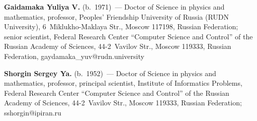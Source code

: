 \vspace*{1pt}

\noindent
\textbf{Gaidamaka Yuliya V.} (b.\ 1971)~--- Doctor of Science in physics and 
mathematics, professor, Peoples' Friendship University of Russia (RUDN 
University), 6~Miklukho-Maklaya Str., Moscow 117198, Russian Federation; 
senior scientist, Federal Research Center ``Computer Science and Control'' of the 
Russian Academy of Sciences, 44-2~Vavilov Str., Moscow 119333, Russian 
Federation, \mbox{gaydamaka\_yuv@rudn.university}

\vspace*{1pt}

\noindent
\textbf{Shorgin Sergey Ya.} (b.\ 1952)~--- Doctor of Science in physics and 
mathematics, professor, principal scientist, Institute of Informatics Problems, 
Federal Research Center ``Computer Science and Control'' of the Russian 
Academy of Sciences, 44-2~Vavilov Str., Moscow 119333, Russian Federation; 
\mbox{sshorgin@ipiran.ru}
\label{end\stat}

\renewcommand{\bibname}{\protect\rm Литература}       